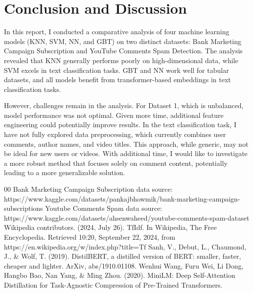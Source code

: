 \documentclass[conference]{IEEEtran}
\begin{document}
\section{Conclusion and Discussion}
In this report, I conducted a comparative analysis of four machine learning models (KNN, SVM, NN, and GBT) on two distinct datasets: Bank Marketing Campaign Subscription and YouTube Comments Spam Detection. The analysis revealed that KNN generally performs poorly on high-dimensional data, while SVM excels in text classification tasks. GBT and NN work well for tabular datasets, and all models benefit from transformer-based embeddings in text classification tasks.

However, challenges remain in the analysis. For Dataset 1, which is unbalanced, model performance was not optimal. Given more time, additional feature engineering could potentially improve results. In the text classification task, I have not fully explored data preprocessing, which currently combines user comments, author names, and video titles. This approach, while generic, may not be ideal for new users or videos. With additional time, I would like to investigate a more robust method that focuses solely on comment content, potentially leading to a more generalizable solution.
\begin{thebibliography}{00}
 Bank Marketing Campaign Subscription data source: https://www.kaggle.com/datasets/pankajbhowmik/bank-marketing-campaign-subscriptions
 Youtube Comments Spam data source: https://www.kaggle.com/datasets/ahsenwaheed/youtube-comments-spam-dataset
 Wikipedia contributors. (2024, July 26). TfIdf. In Wikipedia, The Free Encyclopedia. Retrieved 10:20, September 22, 2024, from https://en.wikipedia.org/w/index.php?title=Tf%
 Sanh, V., Debut, L., Chaumond, J., \& Wolf, T. (2019). DistilBERT, a distilled version of BERT: smaller, faster, cheaper and lighter. ArXiv, abs/1910.01108.
 Wenhui Wang, Furu Wei, Li Dong, Hangbo Bao, Nan Yang, \& Ming Zhou. (2020). MiniLM: Deep Self-Attention Distillation for Task-Agnostic Compression of Pre-Trained Transformers.
\end{thebibliography}
\end{document}
